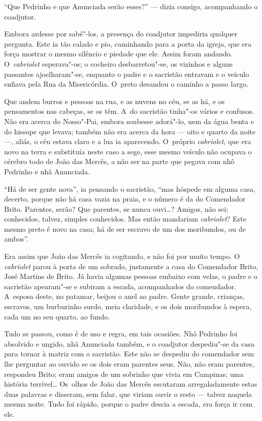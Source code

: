 \begin{linenumbers}
``Que Pedrinho e que Anunciada serão esses?'' --- dizia consigo,
acompanhando o coadjutor.

Embora ardesse por sabê"-los, a presença do coadjutor impediria qualquer
pergunta. Este ia tão calado e pio, caminhando para a porta da igreja,
que era força mostrar o mesmo silêncio e piedade que ele. Assim foram
andando. O~\emph{cabriolet} esperava"-os; o cocheiro desbarretou"-se, os
vizinhos e alguns passantes ajoelharam"-se, enquanto o padre e o
sacristão entravam e o veículo enfiava pela Rua da Misericórdia. O~preto
desandou o caminho a passo largo.

Que andem burros e pessoas na rua, e as nuvens no céu, se as há, e os
pensamentos nas cabeças, se os têm. A~do sacristão tinha"-os vários e
confusos. Não era acerca do Nosso"-Pai, embora soubesse adorá"-lo, nem da
água benta e do hissope que levava; também não era acerca da hora ---
oito e quarto da noite ---, aliás, o céu estava claro e a lua ia
aparecendo. O~próprio \emph{cabriolet}, que era novo na terra e
substituía neste caso a sege, esse mesmo veículo não ocupava o cérebro
todo de João das Mercês, a não ser na parte que pegava com nhô Pedrinho
e nhã Anunciada.

``Há de ser gente nova'', ia pensando o sacristão, ``mas hóspede em
alguma casa, decerto, porque não há casa vazia na praia, e o número é da
do Comendador Brito. Parentes, serão? Que parentes, se nunca ouvi\ldots{}?
Amigos, não sei; conhecidos, talvez, simples conhecidos. Mas então
mandariam \emph{cabriolet}? Este mesmo preto é novo na casa; há de ser
escravo de um dos moribundos, ou de ambos''.

Era assim que João das Mercês ia cogitando, e não foi por muito tempo. O
\emph{cabriolet} parou à porta de um sobrado, justamente a casa do
Comendador Brito, José Martins de Brito. Já havia algumas pessoas
embaixo com velas, o padre e o sacristão apearam"-se e subiram a escada,
acompanhados do comendador. A~esposa deste, no patamar, beijou o anel ao
padre. Gente grande, crianças, escravos, um burburinho surdo, meia
claridade, e os dois moribundos à espera, cada um no seu quarto, ao
fundo.

Tudo se passou, como é de uso e regra, em tais ocasiões. Nhô Pedrinho
foi absolvido e ungido, nhã Anunciada também, e o coadjutor despediu"-se
da casa para tornar à matriz com o sacristão. Este não se despediu do
comendador sem lhe perguntar ao ouvido se os dois eram parentes seus.
Não, não eram parentes, respondeu Brito; eram amigos de um sobrinho que
vivia em Campinas; uma história terrível\ldots{} Os~olhos de João das Mercês
escutaram arregaladamente estas duas palavras e disseram, sem falar, que
viriam ouvir o resto --- talvez naquela mesma noite. Tudo foi rápido,
porque o padre descia a escada, era força ir com ele.


\end{linenumbers}
